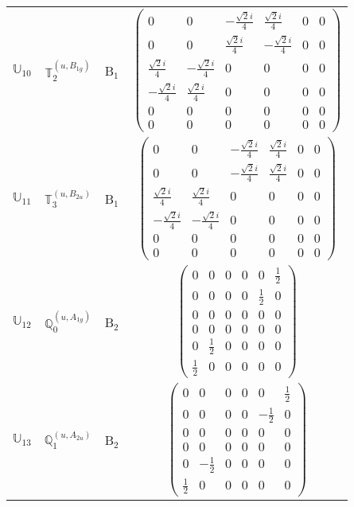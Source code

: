\documentclass[fleqn,10pt,landscape]{article}
\begin{document}
\begin{itemize}
\begin{center}
\begin{longtable}{c|c|c|c}
$ \mathbb{U}_{10} $ & $\mathbb{T}_{2}^{(u,B_{1g})}$ & B$_{1}$ & $\begin{pmatrix} 0 & 0 & - \frac{\sqrt{2} i}{4} & \frac{\sqrt{2} i}{4} & 0 & 0 \\ 0 & 0 & \frac{\sqrt{2} i}{4} & - \frac{\sqrt{2} i}{4} & 0 & 0 \\ \frac{\sqrt{2} i}{4} & - \frac{\sqrt{2} i}{4} & 0 & 0 & 0 & 0 \\ - \frac{\sqrt{2} i}{4} & \frac{\sqrt{2} i}{4} & 0 & 0 & 0 & 0 \\ 0 & 0 & 0 & 0 & 0 & 0 \\ 0 & 0 & 0 & 0 & 0 & 0 \end{pmatrix}$ \\
$ \mathbb{U}_{11} $ & $\mathbb{T}_{3}^{(u,B_{2u})}$ & B$_{1}$ & $\begin{pmatrix} 0 & 0 & - \frac{\sqrt{2} i}{4} & \frac{\sqrt{2} i}{4} & 0 & 0 \\ 0 & 0 & - \frac{\sqrt{2} i}{4} & \frac{\sqrt{2} i}{4} & 0 & 0 \\ \frac{\sqrt{2} i}{4} & \frac{\sqrt{2} i}{4} & 0 & 0 & 0 & 0 \\ - \frac{\sqrt{2} i}{4} & - \frac{\sqrt{2} i}{4} & 0 & 0 & 0 & 0 \\ 0 & 0 & 0 & 0 & 0 & 0 \\ 0 & 0 & 0 & 0 & 0 & 0 \end{pmatrix}$ \\ \hline
$ \mathbb{U}_{12} $ & $\mathbb{Q}_{0}^{(u,A_{1g})}$ & B$_{2}$ & $\begin{pmatrix} 0 & 0 & 0 & 0 & 0 & \frac{1}{2} \\ 0 & 0 & 0 & 0 & \frac{1}{2} & 0 \\ 0 & 0 & 0 & 0 & 0 & 0 \\ 0 & 0 & 0 & 0 & 0 & 0 \\ 0 & \frac{1}{2} & 0 & 0 & 0 & 0 \\ \frac{1}{2} & 0 & 0 & 0 & 0 & 0 \end{pmatrix}$ \\
$ \mathbb{U}_{13} $ & $\mathbb{Q}_{1}^{(u,A_{2u})}$ & B$_{2}$ & $\begin{pmatrix} 0 & 0 & 0 & 0 & 0 & \frac{1}{2} \\ 0 & 0 & 0 & 0 & - \frac{1}{2} & 0 \\ 0 & 0 & 0 & 0 & 0 & 0 \\ 0 & 0 & 0 & 0 & 0 & 0 \\ 0 & - \frac{1}{2} & 0 & 0 & 0 & 0 \\ \frac{1}{2} & 0 & 0 & 0 & 0 & 0 \end{pmatrix}$ \\

\end{longtable}
\end{center}
\end{itemize}
\end{document}
